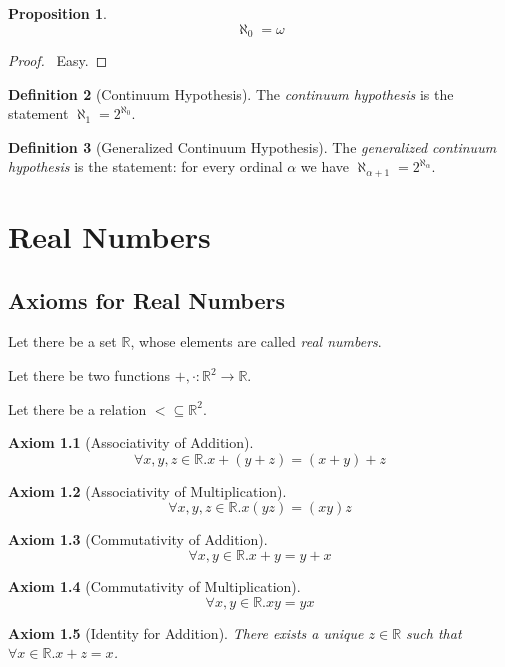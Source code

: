\documentclass{report}
\let\qed\relax
\newtheorem{ax}{Axiom}[chapter]
\newtheorem{prop}[ax]{Proposition}
\theoremstyle{definition}
\newtheorem{df}[ax]{Definition}
\begin{document}
\begin{prop}
\[ \aleph_0 = \omega \]
\end{prop}

\begin{proof}
\pf\ Easy. \qed
\end{proof}

\begin{df}[Continuum Hypothesis]
The \emph{continuum hypothesis} is the statement $\aleph_1 = 2^{\aleph_0}$.
\end{df}

\begin{df}[Generalized Continuum Hypothesis]
The \emph{generalized continuum hypothesis} is the statement: for every ordinal $\alpha$ we have $\aleph_{\alpha + 1} = 2^{\aleph_\alpha}$.
\end{df}

\chapter{Real Numbers}

\section{Axioms for Real Numbers}

Let there be a set $\mathbb{R}$, whose elements are called \emph{real numbers}.

Let there be two functions $+, \cdot : \mathbb{R}^2 \rightarrow \mathbb{R}$.

Let there be a relation $< \subseteq \mathbb{R}^2$.

\begin{ax}[Associativity of Addition]
\[ \forall x,y,z \in \mathbb{R}. x + (y + z) = (x + y) + z \]
\end{ax}

\begin{ax}[Associativity of Multiplication]
\[ \forall x,y,z \in \mathbb{R}. x(yz) = (xy)z \]
\end{ax}

\begin{ax}[Commutativity of Addition]
\[ \forall x,y \in \mathbb{R}. x + y = y + x \]
\end{ax}

\begin{ax}[Commutativity of Multiplication]
\[ \forall x,y \in \mathbb{R}. xy = yx \]
\end{ax}

\begin{ax}[Identity for Addition]
There exists a unique $z \in \mathbb{R}$ such that $\forall x \in \mathbb{R}. x + z = x$.
\end{ax}
\end{document}
